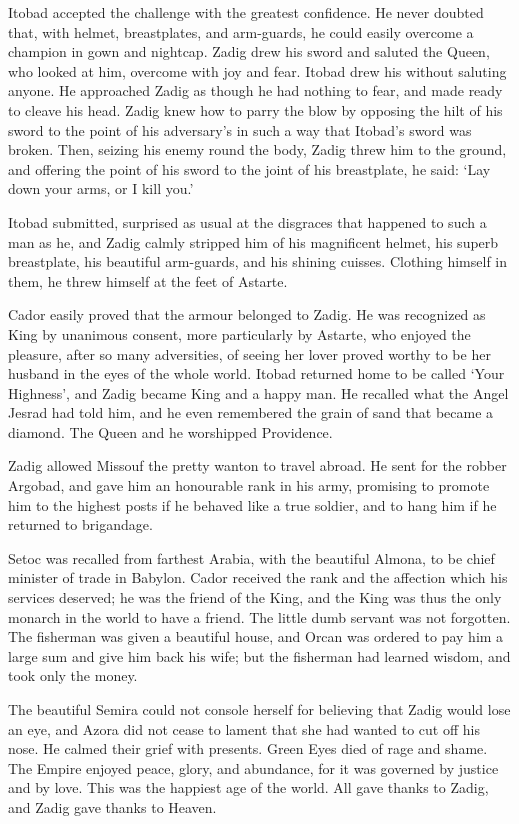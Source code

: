 \documentclass{article}
\begin{document}
\begin{center}
Itobad accepted the challenge with the greatest confidence. He never doubted that, 
with helmet, breastplates, and arm-guards, he could easily overcome a champion 
in gown and nightcap. Zadig drew his sword and saluted the Queen, who looked at 
him, overcome with joy and fear. Itobad drew his without saluting anyone. He approached 
Zadig as though he had nothing to fear, and made ready to cleave his head. Zadig 
knew how to parry the blow by opposing the hilt of his sword to the point of his 
adversary's in such a way that Itobad's sword was broken. Then, seizing his enemy 
round the body, Zadig threw him to the ground, and offering the point of his sword 
to the joint of his breastplate, he said: `Lay down your arms, or I kill you.' 

Itobad submitted, surprised as usual at the disgraces that happened to such a man 
as he, and Zadig calmly stripped him of his magnificent helmet, his superb breastplate, 
his beautiful arm-guards, and his shining cuisses. Clothing himself in them, he 
threw himself at the feet of Astarte. 

Cador easily proved that the armour belonged to Zadig. He was recognized as King 
by unanimous consent, more particularly by Astarte, who enjoyed the pleasure, after 
so many adversities, of seeing her lover proved worthy to be her husband in the 
eyes of the whole world. Itobad returned home to be called `Your Highness', and 
Zadig became King and a happy man. He recalled what the Angel Jesrad had told him, 
and he even remembered the grain of sand that became a diamond. The Queen and he 
worshipped Providence. 

Zadig allowed Missouf the pretty wanton to travel abroad. He sent for the robber 
Argobad, and gave him an honourable rank in his army, promising to promote him 
to the highest posts if he behaved like a true soldier, and to hang him if he returned 
to brigandage. 

Setoc was recalled from farthest Arabia, with the beautiful Almona, to be chief 
minister of trade in Babylon. Cador received the rank and the affection which his 
services deserved; he was the friend of the King, and the King was thus the only 
monarch in the world to have a friend. The little dumb servant was not forgotten. 
The fisherman was given a beautiful house, and Orcan was ordered to pay him a large 
sum and give him back his wife; but the fisherman had learned wisdom, and took 
only the money. 

The beautiful Semira could not console herself for believing that Zadig would lose 
an eye, and Azora did not cease to lament that she had wanted to cut off his nose. 
He calmed their grief with presents. Green Eyes died of rage and shame. The Empire 
enjoyed peace, glory, and abundance, for it was governed by justice and by love. 
This was the happiest age of the world. All gave thanks to Zadig, and Zadig gave 
thanks to Heaven.\pagebreak{} 


\end{center}
\end{document}
